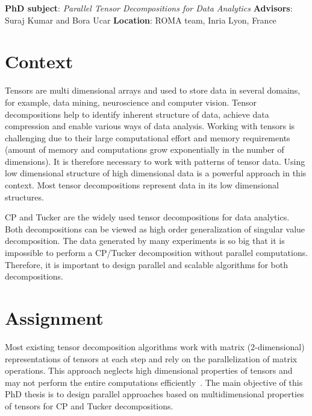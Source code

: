 \documentclass[a4paper]{article}
\date{}
\begin{document}
\noindent\textbf{PhD subject}: \emph{Parallel Tensor Decompositions for Data Analytics}\newline
\textbf{Advisors}: Suraj Kumar and Bora Ucar\newline
\textbf{Location}: ROMA team, Inria Lyon, France
\section*{Context}
Tensors are multi dimensional arrays and used to store data in several domains, for example, data mining, neuroscience and computer vision. Tensor decompositions help to identify inherent structure of data, achieve data compression and enable various ways of data analysis. Working with tensors is challenging due to their large computational effort and memory requirements (amount of memory and computations grow exponentially in the number of dimensions). It is therefore necessary to work with patterns of tensor data. Using low dimensional structure of high dimensional data is a powerful approach in this context. Most tensor decompositions represent data in its low dimensional structures.

CP and Tucker are the widely used tensor decompositions for data analytics. Both decompositions can be viewed as high order generalization of singular value decomposition. The data generated by many experiments is so big that it is impossible to perform a CP/Tucker decomposition without parallel computations. Therefore, it is important to design parallel and scalable algorithms for both decompositions.






\section*{Assignment}
Most existing tensor decomposition algorithms work with matrix (2-dimensional) representations of tensors at each step and rely on the parallelization of matrix operations. This approach neglects high dimensional properties of tensors and may not perform the entire computations efficiently~\cite{ABGKR-SIMAX-2024,BKR-IPDPS-2018}. The main objective of this PhD thesis is to design parallel approaches based on multidimensional properties of tensors for CP and Tucker decompositions. 
\end{document}
